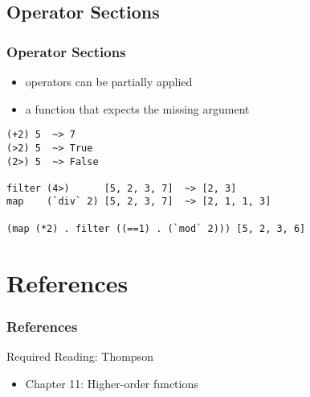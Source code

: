 \documentclass[dvipsnames]{beamer}
\theoremstyle{plain}
\begin{document}
\subsection{Operator Sections}

\begin{frame}[fragile]
  \frametitle{Operator Sections}

  \begin{itemize}
    \item operators can be partially applied
    \item a function that expects the missing argument
  \end{itemize}

  \begin{exampleblock}{}
    \begin{lstlisting}
(+2) 5  ~> 7
(>2) 5  ~> True
(2>) 5  ~> False

filter (4>)      [5, 2, 3, 7]  ~> [2, 3]
map    (`div` 2) [5, 2, 3, 7]  ~> [2, 1, 1, 3]

(map (*2) . filter ((==1) . (`mod` 2))) [5, 2, 3, 6]
    \end{lstlisting}
  \end{exampleblock}
\end{frame}


%
%
%

\section*{References}

\begin{frame}
  \frametitle{References}

  \begin{block}{Required Reading: Thompson}
    \begin{itemize}
      \item Chapter 11: \alert{Higher-order functions}
    \end{itemize}
  \end{block}
\end{frame}
\end{document}
